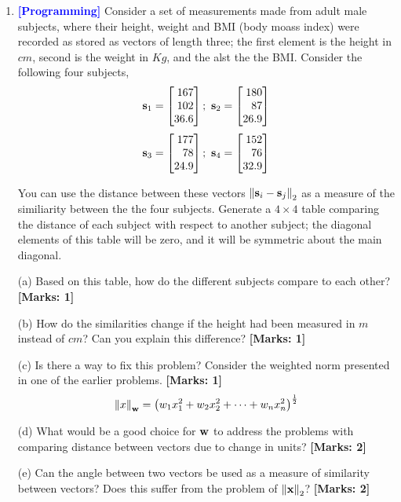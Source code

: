 \documentclass[12pt]{article}
\def\mf{\ensuremath\mathbf}
\begin{document}
\begin{enumerate}
    \item \textcolor{blue}{\textbf{[Programming]}} Consider a set of measurements made from adult male subjects, where their height, weight and BMI (body moass index) were recorded as stored as vectors of length three; the first element is the height in $cm$, second is the weight in $Kg$, and the alst the the BMI. Consider the following four subjects,
    \[ \mf{s}_1 =  \begin{bmatrix*}[r]167\\102\\36.6\end{bmatrix*}; \,\,
    \mf{s}_2 =  \begin{bmatrix*}[r]180\\87\\26.9\end{bmatrix*} \]
    \[ \mf{s}_3 =  \begin{bmatrix*}[r]177\\78\\24.9\end{bmatrix*}; \,\,
    \mf{s}_4 =  \begin{bmatrix*}[r]152\\76\\32.9\end{bmatrix*} \]

    You can use the distance between these vectors $\left\lVert \mf{s}_i - \mf{s}_j\right\rVert_2$ as a measure of the similiarity between the the four subjects. Generate a $4 \times 4$ table comparing the distance of each subject with respect to another subject; the diagonal elements of this table will be zero, and it will be symmetric about the main diagonal. 

    (a) Based on this table, how do the different subjects compare to each other?  \textbf{[Marks: 1]}

    (b) How do the similarities change if the height had been measured in $m$ instead of $cm$? Can you explain this difference?  \textbf{[Marks: 1]}

    (c) Is there a way to fix this problem? Consider the weighted norm presented in one of the earlier problems.  \textbf{[Marks: 1]}
    \[ \left\lVert x \right\rVert_\mf{w} = \left(w_1 x_1^2 + w_2 x_2^2 + \cdots + w_n x_n^2\right)^{\frac{1}{2}} \]

    (d) What would be a good choice for $\mf{w}$ to address the problems with comparing distance between vectors due to change in units? \textbf{[Marks: 2]}

    (e) Can the angle between two vectors be used as a measure of similarity between vectors? Does this suffer from the problem of $\left\lVert \mf{x} \right\rVert_2$?  \textbf{[Marks: 2]}
\end{enumerate}
\end{document}
